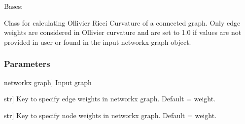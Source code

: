 \documentclass[letterpaper,10pt,english]{sphinxmanual}
\begin{document}
\begin{fulllineitems}
\label{\detokenize{graph_ricci_curvature:graph_ricci_curvature.ollivier_ricci_curvature.OllivierRicciCurvature}}
\pysigstartsignatures
{}
\pysigstopsignatures
\sphinxAtStartPar
Bases: 

\sphinxAtStartPar
Class for calculating Ollivier Ricci Curvature of a connected graph. Only
edge weights are considered in Ollivier curvature and are set to 1.0 if values
are not provided in user or found in the input networkx graph object.


\subsubsection{Parameters}
\label{\detokenize{graph_ricci_curvature:id3}}\begin{description}
\sphinxlineitem{G}{[}networkx graph{]}
\sphinxAtStartPar
Input graph

\sphinxlineitem{edge\_weight\_key}{[}str{]}
\sphinxAtStartPar
Key to specify edge weights in networkx graph. Default = weight.

\sphinxlineitem{node\_weight\_key}{[}str{]}
\sphinxAtStartPar
Key to specify node weights in networkx graph. Default = weight.

\end{description}


\end{fulllineitems}
\end{document}
